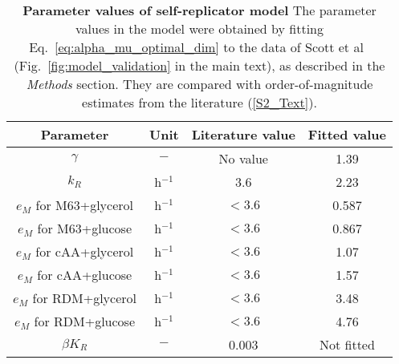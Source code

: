 \documentclass[a4paper,12pt]{article}
\begin{document}
\begin{flushleft}
{\Large
\textbf{}
}
\newline

\end{flushleft}

\begin{table}[!h]
\centering
\begin{tabular}{|c|c|c|c|}
\hline
Parameter & Unit & Literature value & Fitted value \\
\hline
$\gamma$ & $-$ & No value & 1.39\\
\hline
$k_R$ & h$^{-1}$ & 3.6 & 2.23\\
\hline
$e_M$ for M63+glycerol & h$^{-1}$ &  $< 3.6$ & 0.587\\
\hline
$e_M$ for M63+glucose & h$^{-1}$ &  $< 3.6$ & 0.867\\
\hline
$e_M$ for cAA+glycerol & h$^{-1}$ &  $< 3.6$ & 1.07\\
\hline
$e_M$ for cAA+glucose & h$^{-1}$ &  $< 3.6$ & 1.57\\
\hline
$e_M$ for RDM+glycerol & h$^{-1}$ &  $< 3.6$ & 3.48\\
\hline
$e_M$ for RDM+glucose & h$^{-1}$ &  $< 3.6$ & 4.76\\
\hline
$\beta K_R$ & $-$  & 0.003 & Not fitted\\
\hline
\end{tabular}
\caption{\textbf{Parameter values of self-replicator model}
The parameter values in the model were obtained by fitting Eq.~\ref{eq:alpha_mu_optimal_dim} to the data of Scott et al~\cite{scott_interdependence_2010} (Fig.~\ref{fig:model_validation} in the main text), as described in the \textit{Methods} section. They are compared with order-of-magnitude estimates from the literature (\ref{S2_Text}). }
\end{table}



\end{document}
